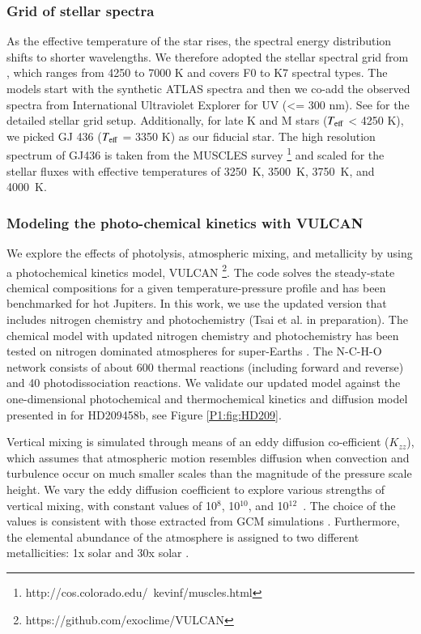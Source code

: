 \subsubsection{Grid of stellar spectra}

As the effective temperature of the star rises, the spectral energy distribution shifts to shorter wavelengths. We therefore adopted the stellar spectral grid from \citep{Rugheimer2013}, which ranges from 4250 to 7000 K and covers F0 to K7 spectral types. The models start with the synthetic ATLAS spectra \citep{Kurucz1979} and then we co-add the observed spectra from International Ultraviolet Explorer for UV (<= 300 nm). See \citep{Rugheimer2013} for the detailed stellar grid setup. Additionally, for late K and M stars ($T_{\rm eff}$ < 4250 K), we picked GJ 436 ($T_{\rm eff}$ = 3350 K) as our fiducial star. The high resolution spectrum of GJ436 is taken from the MUSCLES survey \citep{France2016}\footnote{http://cos.colorado.edu/~kevinf/muscles.html} and scaled for the stellar fluxes with effective temperatures of 3250~K, 3500~K, 3750~K, and 4000~K.

\subsubsection{Modeling the photo-chemical kinetics with VULCAN}
\label{P1:subsec:VULCAN}

We explore the effects of photolysis, atmospheric mixing, and metallicity by using a photochemical kinetics model, VULCAN \citep{Tsai2017}\footnote{https://github.com/exoclime/VULCAN}. The code solves the steady-state chemical compositions for a given temperature-pressure profile and has been benchmarked for hot Jupiters. In this work, we use the updated version that includes nitrogen chemistry and photochemistry (Tsai et al. in preparation). The chemical model with updated nitrogen chemistry and photochemistry has been tested on nitrogen dominated atmospheres for super-Earths \citep{Zilinskas2020}. The N-C-H-O network consists of about 600 thermal reactions (including forward and reverse) and 40 photodissociation reactions. We validate our updated model against the one-dimensional photochemical and thermochemical kinetics and diffusion model presented in \citet{Moses2011} for HD209458b, see Figure \ref{P1:fig:HD209}.

Vertical mixing is simulated through means of an eddy diffusion co-efficient ($K_{zz}$), which assumes that atmospheric motion resembles diffusion when convection and turbulence occur on much smaller scales than the magnitude of the pressure scale height. We vary the eddy diffusion coefficient to explore various strengths of vertical mixing, with constant values of 10$^8$, 10$^{10}$, and 10$^{12}$~\cmcms. The choice of the values is consistent with those extracted from GCM simulations \citep{Moses2011, Parmentier2013, Zhang2018c, Komacek2019}. Furthermore, the elemental abundance of the atmosphere is assigned to two different metallicities: 1x solar and 30x solar \citep{Lodders2009a}.




